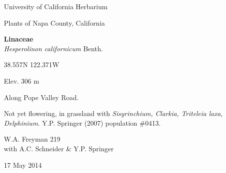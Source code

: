 \documentclass[letterpaper,10pt]{article}
\begin{document}
\begin{minipage}[t]{0.40\textwidth}

\begin{center}
University of California Herbarium \\
\begin{large}
Plants of Napa County, California \\
\end{large}
\vspace{\baselineskip}
\textbf{Linaceae} \\
\textit{Hesperolinon californicum} Benth.\\
\end{center}

\begin{footnotesize}

\begin{multicols}{2}
38.557\textdegree N 122.371\textdegree W
\columnbreak
\begin{flushright}
Elev. 306 m
\end{flushright}
\end{multicols}

Along Pope Valley Road.
\vspace{\baselineskip}

Not yet flowering, in grassland with \textit{Sisyrinchium, Clarkia, Triteleia laxa, Delphinium}. Y.P. Springer (2007) population \#0413.

\begin{multicols}{2}
W.A. Freyman 219 \\
with A.C. Schneider \& Y.P. Springer
\columnbreak
\begin{flushright}
17 May 2014
\end{flushright}
\end{multicols}

\end{footnotesize}

\end{minipage}

\vspace{2cm}
%
%

%
%
\end{document}
